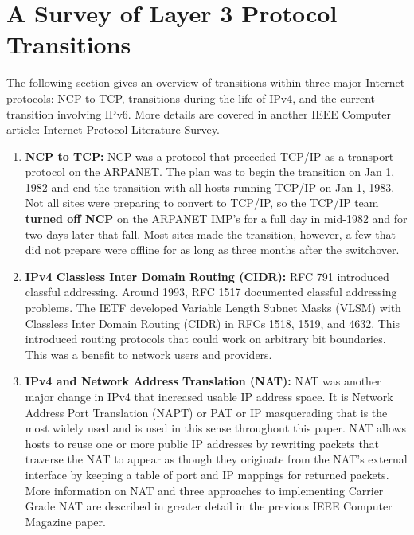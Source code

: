 \section {A Survey of Layer 3 Protocol Transitions}
The following section gives an overview of transitions within three
major Internet protocols: NCP to TCP, transitions during the life
of IPv4, and the current transition involving IPv6. More details
are covered in another IEEE Computer article: Internet Protocol Literature Survey.

\begin{enumerate}
 \item 
\textbf{NCP to TCP:}
NCP was a protocol that preceded TCP/IP as a transport protocol
on the ARPANET.  The plan was to begin the transition on Jan 1,
1982 and end the transition with all hosts running TCP/IP on Jan
1, 1983.  Not all sites were preparing to convert to TCP/IP, so
the TCP/IP team \textbf{turned off NCP} on the ARPANET IMP's for a
full day in mid-1982 \cite{Imp01} and for two days later that fall.
Most sites made the transition, however, a few that did not prepare
were offline for as long as three months after the switchover.

\item
\textbf{IPv4 Classless Inter Domain Routing (CIDR):}
RFC 791 introduced classful addressing.  Around 1993, RFC 1517
documented classful addressing problems\cite{rfc1517}. The IETF
developed Variable Length Subnet Masks (VLSM) with Classless Inter
Domain Routing (CIDR) in RFCs 1518, 1519, and 4632.  This introduced
routing protocols that could work on arbitrary bit boundaries.
This was a benefit to network users and providers.

\item
\textbf{IPv4 and Network Address Translation (NAT):} NAT was another
major change in IPv4 that increased usable IP address space.
It is Network Address Port Translation
(NAPT) or PAT or IP masquerading that is the most widely used and
is used in this sense throughout this paper.  NAT allows hosts to
reuse one or more public IP addresses by rewriting packets that
traverse the NAT to appear as though they originate from the NAT's
external interface by keeping a table of port and IP mappings for
returned packets.  More information on NAT and three approaches to
implementing Carrier Grade NAT are described in greater detail in
the previous IEEE Computer Magazine paper.


\end{enumerate}
